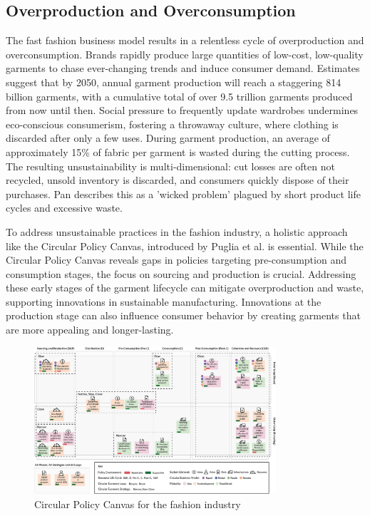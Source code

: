 \subsection{Overproduction and Overconsumption}
The fast fashion business model results in a relentless cycle of overproduction and overconsumption. Brands rapidly produce large quantities of low-cost, low-quality garments to chase ever-changing trends and induce consumer demand. Estimates suggest that by 2050, annual garment production will reach a staggering 814 billion garments, with a cumulative total of over 9.5 trillion garments produced from now until then. Social pressure to frequently update wardrobes undermines eco-conscious consumerism, fostering a throwaway culture, where clothing is discarded after only a few uses. During garment production, an average of approximately 15\% of fabric per garment is wasted during the cutting process. The resulting unsustainability is multi-dimensional: cut losses are often not recycled, unsold inventory is discarded, and consumers quickly dispose of their purchases. Pan describes this as a 'wicked problem' plagued by short product life cycles and excessive waste.

\vspace{\baselineskip}
To address unsustainable practices in the fashion industry, a holistic approach like the Circular Policy Canvas, introduced by Puglia et al. is essential. While the Circular Policy Canvas reveals gaps in policies targeting pre-consumption and consumption stages, the focus on sourcing and production is crucial. Addressing these early stages of the garment lifecycle can mitigate overproduction and waste, supporting innovations in sustainable manufacturing. Innovations at the production stage can also influence consumer behavior by creating garments that are more appealing and longer-lasting.
\begin{figure} [H]
    \centering
    \includegraphics[width=0.8\textwidth]{Images/circular policy canvas.png}
    \caption{Circular Policy Canvas for the fashion industry}
\end{figure}

